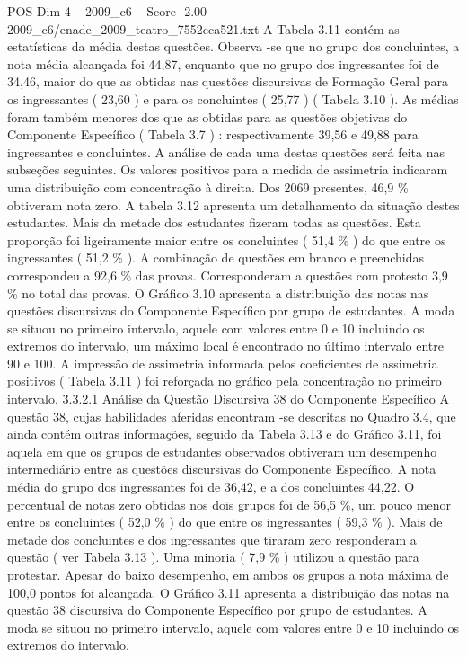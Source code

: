 \begin{textsample}{POS Dim 4 – 2009\_c6 – Score -2.00 – 2009\_c6/enade\_2009\_teatro\_7552cca521.txt}
A Tabela 3.11 contém as estatísticas da média destas questões.
Observa -se que no grupo dos concluintes, a nota média alcançada foi 44,87, enquanto que no grupo dos ingressantes foi de 34,46, maior do que as obtidas nas questões discursivas de Formação Geral para os ingressantes ( 23,60 ) e para os concluintes ( 25,77 ) ( Tabela 3.10 ).
As médias foram também menores dos que as obtidas para as questões objetivas do Componente Específico ( Tabela 3.7 ) : respectivamente 39,56 e 49,88 para ingressantes e concluintes.
A análise de cada uma destas questões será feita nas subseções seguintes.
Os valores positivos para a medida de assimetria indicaram uma distribuição com concentração à direita.
Dos 2069 presentes, 46,9 \% obtiveram nota zero.
A tabela 3.12 apresenta um detalhamento da situação destes estudantes.
Mais da metade dos estudantes fizeram todas as questões.
Esta proporção foi ligeiramente maior entre os concluintes ( 51,4 \% ) do que entre os ingressantes ( 51,2 \% ).
A combinação de questões em branco e preenchidas correspondeu a 92,6 \% das provas.
Corresponderam a questões com protesto 3,9 \% no total das provas.
O Gráfico 3.10 apresenta a distribuição das notas nas questões discursivas do Componente Específico por grupo de estudantes.
A moda se situou no primeiro intervalo, aquele com valores entre 0 e 10 incluindo os extremos do intervalo, um máximo local é encontrado no último intervalo entre 90 e 100.
A impressão de assimetria informada pelos coeficientes de assimetria positivos ( Tabela 3.11 ) foi reforçada no gráfico pela concentração no primeiro intervalo. 3.3.2.1 Análise da Questão Discursiva 38 do Componente Específico A questão 38, cujas habilidades aferidas encontram -se descritas no Quadro 3.4, que ainda contém outras informações, seguido da Tabela 3.13 e do Gráfico 3.11, foi aquela em que os grupos de estudantes observados obtiveram um desempenho intermediário entre as questões discursivas do Componente Específico.
A nota média do grupo dos ingressantes foi de 36,42, e a dos concluintes 44,22.
O percentual de notas zero obtidas nos dois grupos foi de 56,5 \%, um pouco menor entre os concluintes ( 52,0 \% ) do que entre os ingressantes ( 59,3 \% ).
Mais de metade dos concluintes e dos ingressantes que tiraram zero responderam a questão ( ver Tabela 3.13 ).
Uma minoria ( 7,9 \% ) utilizou a questão para protestar.
Apesar do baixo desempenho, em ambos os grupos a nota máxima de 100,0 pontos foi alcançada.
O Gráfico 3.11 apresenta a distribuição das notas na questão 38 discursiva do Componente Específico por grupo de estudantes.
A moda se situou no primeiro intervalo, aquele com valores entre 0 e 10 incluindo os extremos do intervalo.

\end{textsample}
